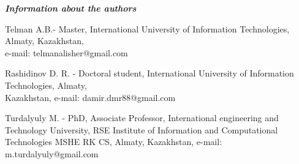 \emph{{\bfseries Information about the authors}}
\begin{noparindent}

Telman A.B.- Master, International University of Information
Technologies, Almaty, Kazakhstan,\\ e-mail: telmanalisher@gmail.com

Rashidinov D. R. - Doctoral student, International University of
Information Technologies, Almaty,\\ Kazakhstan, e-mail:
damir.dmr88@gmail.com

Turdalyuly M. - PhD, Associate Professor, International engineering and Technology University, RSE Institute of
Information and Computational Technologies MSHE RK CS, Almaty, Kazakhstan, e-mail: m.turdalyuly@gmail.com
\end{noparindent}









